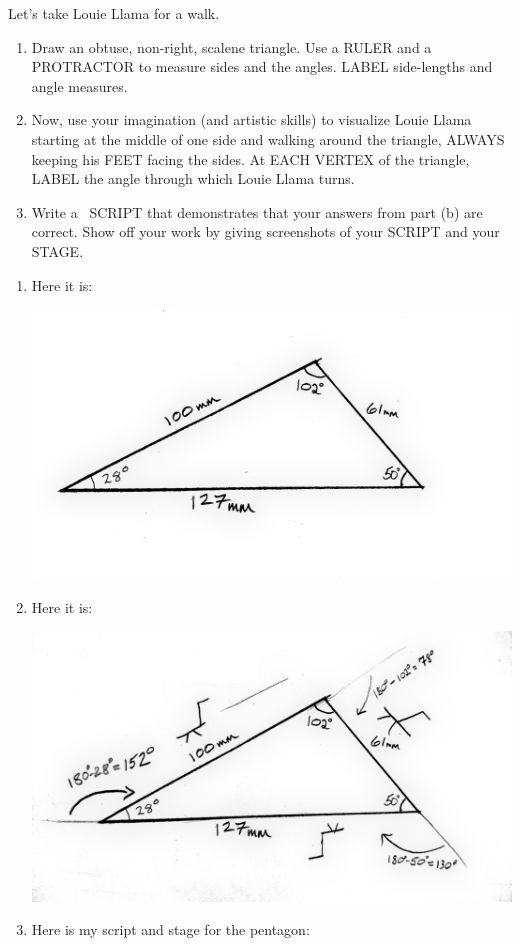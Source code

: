 \documentclass[nooutcomes,noauthor,handout]{ximera}
\begin{document}
\begin{question}
  Let's take Louie Llama for a walk.
  \begin{enumerate}
  \item Draw an obtuse, non-right, scalene triangle. Use a RULER and a
    PROTRACTOR to measure sides and the angles. LABEL side-lengths and
    angle measures.
  \item Now, use your imagination (and artistic skills) to visualize
    Louie Llama starting at the middle of one side and walking around
    the triangle, ALWAYS keeping his FEET facing the sides. At EACH
    VERTEX of the triangle, LABEL the angle through which Louie Llama
    turns.
  \item Write a \snap\ SCRIPT that demonstrates that your answers from
    part (b) are correct. Show off your work by giving screenshots of
    your SCRIPT and your STAGE.
  \end{enumerate}
  \begin{freeResponse}
    \begin{enumerate}
    \item Here it is:
      \begin{center}
        \includegraphics[width=.4\textwidth]{specificTri.jpg}
      \end{center}
    \item Here it is:
      \begin{center}
        \includegraphics[width=.4\textwidth]{llamaAndSpecificTri.jpg}
      \end{center}
    \item Here is my script and stage for the pentagon:
      \begin{center}

\end{center}
\end{enumerate}
\end{freeResponse}
\end{question}
\end{document}

